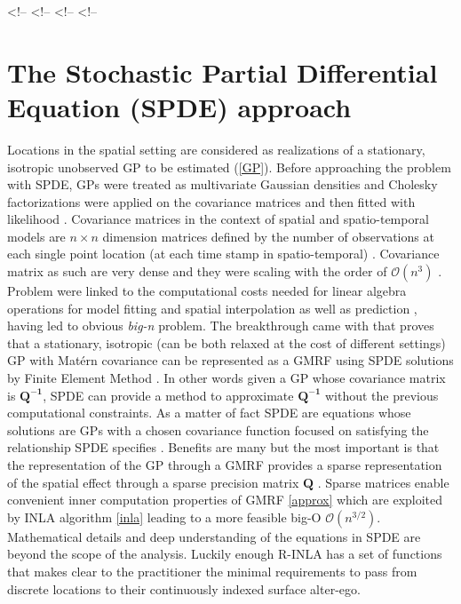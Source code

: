 \documentclass[
  12pt,
  a4paper,
  oneside]{book}
\theoremstyle{definition}
\theoremstyle{definition}
\theoremstyle{definition}
\theoremstyle{remark}
\begin{document}
\textless!--
\textless!--
\textless!--
\textless!--

\hypertarget{spdeapproach}{%
\section{The Stochastic Partial Differential Equation (SPDE) approach}\label{spdeapproach}}

Locations in the spatial setting are considered as realizations of a stationary, isotropic unobserved GP to be estimated (\ref{GP}). Before approaching the problem with SPDE, GPs were treated as multivariate Gaussian densities and Cholesky factorizations were applied on the covariance matrices and then fitted with likelihood \citep{LecturePaci}. Covariance matrices in the context of spatial and spatio-temporal models \citep{PACI2017149, Cameletti2012} are \(n \times n\) dimension matrices defined by the number of observations at each single point location (at each time stamp in spatio-temporal) \citep{BLANGIARDO201339}. Covariance matrix as such are very dense and they were scaling with the order of \(\mathcal{O}\left(n^{3}\right)\) \citep{Banerjee-Gelfand}. Problem were linked to the computational costs needed for linear algebra operations for model fitting and spatial interpolation as well as prediction \citep{Cameletti2012}, having led to obvious \emph{big-n} problem.
The breakthrough came with \citet{Lindgren2011} that proves that a stationary, isotropic (can be both relaxed at the cost of different settings) GP with Matérn covariance can be represented as a GMRF using SPDE solutions by Finite Element Method \citep{Krainski-Rubio}. In other words given a GP whose covariance matrix is \(\boldsymbol{Q^{-1}}\), SPDE can provide a method to approximate \(\boldsymbol{Q^{-1}}\) without the previous computational constraints. As a matter of fact SPDE are equations whose solutions are GPs with a chosen covariance function focused on satisfying the relationship SPDE specifies \citeyearpar{Krainski-Rubio}.
Benefits are many but the most important is that the representation of the GP through a GMRF provides a sparse representation of the spatial effect through a sparse precision matrix \(\boldsymbol{Q}\) . Sparse matrices enable convenient inner computation properties of GMRF \ref{approx} which are exploited by INLA algorithm \ref{inla} leading to a more feasible big-O \(\mathcal{O}\left(n^{3 / 2}\right)\). Mathematical details and deep understanding of the equations in SPDE are beyond the scope of the analysis. Luckily enough R-INLA has a set of functions that makes clear to the practitioner the minimal requirements to pass from discrete locations to their continuously indexed surface alter-ego.
\end{document}
